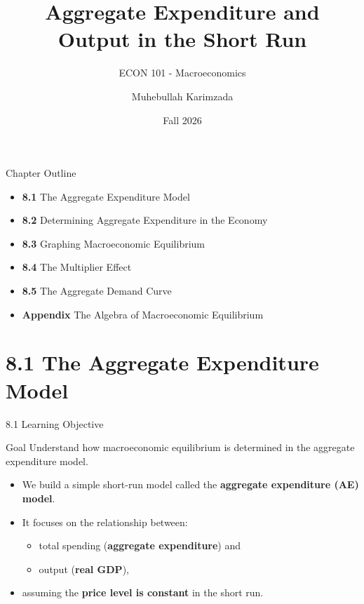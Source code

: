 \documentclass[aspectratio=169]{beamer}
\title{\textbf{Aggregate Expenditure and Output in the Short Run \vspace{.5cm}\\  }}
\subtitle{ {\large ECON 101 - Macroeconomics}}
\author{Muhebullah Karimzada}
\date{Fall 2026}
\begin{document}
\begin{frame}[plain]
  \titlepage
\end{frame}

\begin{frame}{Chapter Outline}
\transfade
\begin{itemize}
  \item \textbf{8.1} The Aggregate Expenditure Model
  \item \textbf{8.2} Determining Aggregate Expenditure in the Economy
  \item \textbf{8.3} Graphing Macroeconomic Equilibrium
  \item \textbf{8.4} The Multiplier Effect
  \item \textbf{8.5} The Aggregate Demand Curve
  \item \textbf{Appendix} The Algebra of Macroeconomic Equilibrium
\end{itemize}
\end{frame}

\section{8.1 The Aggregate Expenditure Model}

\begin{frame}{8.1 Learning Objective}
\transfade
\begin{block}{Goal}
Understand how macroeconomic equilibrium is determined in the aggregate expenditure model.
\end{block}
\begin{itemize}
  \item We build a simple short-run model called the \textbf{aggregate expenditure (AE) model}.
  \item It focuses on the relationship between:
  \begin{itemize}
    \item total spending (\textbf{aggregate expenditure}) and
    \item output (\textbf{real GDP}),
  \end{itemize}
  \item assuming the \textbf{price level is constant} in the short run.
\end{itemize}
\end{frame}
\end{document}
